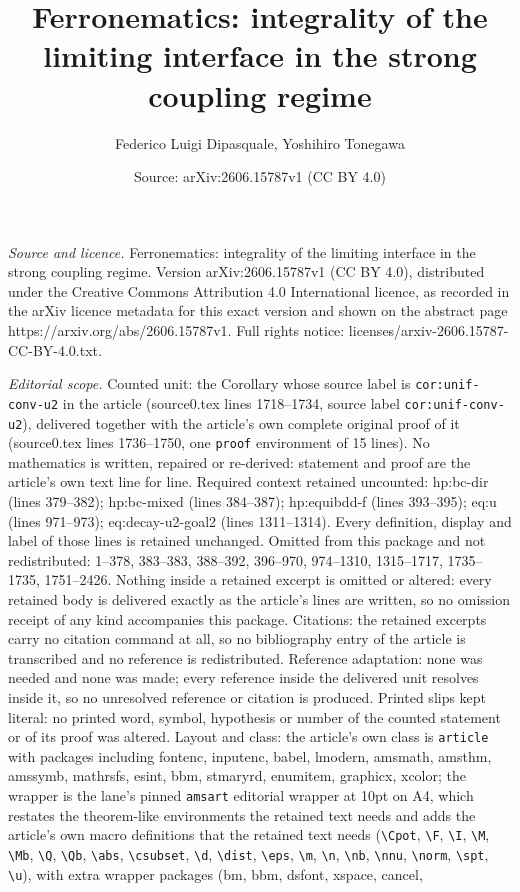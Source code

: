 \documentclass[10pt,a4paper]{amsart}
\title[Ferronematics: integrality of the limiting interface in the ]{Ferronematics: integrality of the limiting interface in the strong coupling regime}
\author{Federico Luigi Dipasquale, Yoshihiro Tonegawa}
\date{Source: arXiv:2606.15787v1 (CC BY 4.0)}
\begin{document}
\maketitle

\noindent\emph{Source and licence.} Ferronematics: integrality of the limiting interface in the strong coupling regime. Version arXiv:2606.15787v1 (CC BY 4.0), distributed under the Creative Commons Attribution 4.0 International licence, as recorded in the arXiv licence metadata for this exact version and shown on the abstract page https://arxiv.org/abs/2606.15787v1. Full rights notice: licenses/arxiv-2606.15787-CC-BY-4.0.txt.\par\smallskip

\noindent\textit{Editorial scope.} Counted unit: the Corollary whose source label is \texttt{cor:unif-conv-u2} in the article (source0.tex lines 1718--1734, source label \texttt{cor:unif-conv-u2}), delivered together with the article's own complete original proof of it (source0.tex lines 1736--1750, one \texttt{proof} environment of 15 lines). No mathematics is written, repaired or re-derived: statement and proof are the article's own text line for line. Required context retained uncounted: hp:bc-dir (lines 379--382); hp:bc-mixed (lines 384--387); hp:equibdd-f (lines 393--395); eq:u (lines 971--973); eq:decay-u2-goal2 (lines 1311--1314). Every definition, display and label of those lines is retained unchanged. Omitted from this package and not redistributed: 1--378, 383--383, 388--392, 396--970, 974--1310, 1315--1717, 1735--1735, 1751--2426. Nothing inside a retained excerpt is omitted or altered: every retained body is delivered exactly as the article's lines are written, so no omission receipt of any kind accompanies this package. Citations: the retained excerpts carry no citation command at all, so no bibliography entry of the article is transcribed and no reference is redistributed. Reference adaptation: none was needed and none was made; every reference inside the delivered unit resolves inside it, so no unresolved reference or citation is produced. Printed slips kept literal: no printed word, symbol, hypothesis or number of the counted statement or of its proof was altered. Layout and class: the article's own class is \texttt{article} with packages including fontenc, inputenc, babel, lmodern, amsmath, amsthm, amssymb, mathrsfs, esint, bbm, stmaryrd, enumitem, graphicx, xcolor; the wrapper is the lane's pinned \texttt{amsart} editorial wrapper at 10pt on A4, which restates the theorem-like environments the retained text needs and adds the article's own macro definitions that the retained text needs (\texttt{\textbackslash Cpot}, \texttt{\textbackslash F}, \texttt{\textbackslash I}, \texttt{\textbackslash M}, \texttt{\textbackslash Mb}, \texttt{\textbackslash Q}, \texttt{\textbackslash Qb}, \texttt{\textbackslash abs}, \texttt{\textbackslash csubset}, \texttt{\textbackslash d}, \texttt{\textbackslash dist}, \texttt{\textbackslash eps}, \texttt{\textbackslash m}, \texttt{\textbackslash n}, \texttt{\textbackslash nb}, \texttt{\textbackslash nnu}, \texttt{\textbackslash norm}, \texttt{\textbackslash spt}, \texttt{\textbackslash u}), with extra wrapper packages (bm, bbm, dsfont, xspace, cancel, 
\end{document}
